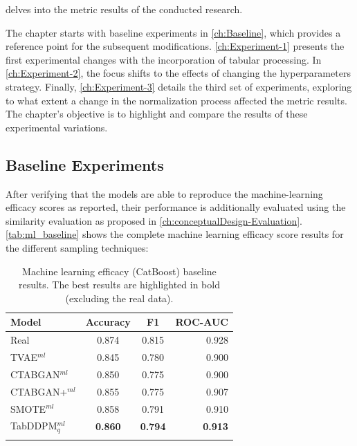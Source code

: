  delves into the metric results of the conducted research. 

The chapter starts with baseline experiments in \autoref{ch:Baseline}, which provides a reference point for the subsequent modifications. 
\autoref{ch:Experiment-1} presents the first experimental changes with the incorporation of tabular processing. 
In \autoref{ch:Experiment-2}, the focus shifts to the effects of changing the hyperparameters strategy.
Finally, \autoref{ch:Experiment-3} details the third set of experiments, exploring to what extent a change in the normalization process affected the metric results. 
The chapter's objective is to highlight and compare the results of these experimental variations.

\subsection{Baseline Experiments}
\label{ch:Baseline}

After verifying that the models are able to reproduce the machine-learning efficacy scores as reported,
their performance is additionally evaluated using the similarity evaluation as proposed in \autoref{ch:conceptualDesign-Evaluation}.
\autoref{tab:ml_baseline} shows the complete machine learning efficacy score results for the different sampling techniques:

\begin{table}[h]
	\centering
	\begin{tabular}{lccr}
		\toprule
		\textbf{Model}     & \textbf{Accuracy} & \textbf{F1}    & \textbf{ROC-AUC} \\
		\midrule
		Real               & 0.874              & 0.815          & 0.928            \\
		TVAE$^{ml}$        & 0.845              & 0.780          & 0.900            \\
		CTABGAN$^{ml}$     & 0.850              & 0.775          & 0.900            \\
		CTABGAN+$^{ml}$    & 0.855              & 0.775          & 0.907            \\
		SMOTE$^{ml}$       & 0.858              & 0.791          & 0.910            \\
		TabDDPM$^{ml}_{q}$ & \textbf{0.860}     & \textbf{0.794} & \textbf{0.913}   \\
		\bottomrule
		\multicolumn{4}{c}{}\\[-0.6em]
	\end{tabular}
	\caption[ML-efficacy Baseline]{Machine learning efficacy (CatBoost) baseline results. The best results are highlighted in bold (excluding the real data).}
	\label{tab:ml_baseline}
\end{table}


